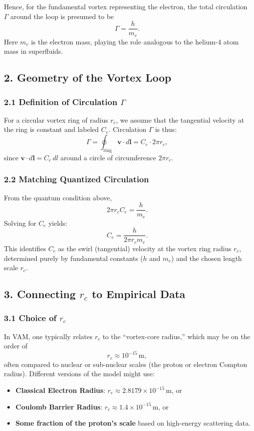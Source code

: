 \documentclass[aps,preprint,superscriptaddress]{revtex4-2}
\begin{document}
    Hence, for the fundamental vortex representing the electron, the total circulation \(\Gamma\) around the loop is presumed to be
    \[
        \Gamma = \frac{h}{m_e}.
    \]
    Here \(m_e\) is the electron mass, playing the role analogous to the helium-4 atom mass in superfluids.

    \subsection*{2. Geometry of the Vortex Loop}

    \subsubsection*{2.1 Definition of Circulation \(\Gamma\)}

    For a circular vortex ring of radius \(r_c\), we assume that the tangential velocity at the ring is constant and labeled \(C_e\). Circulation \(\Gamma\) is thus:
    \[
        \Gamma = \oint_{\text{ring}} \mathbf{v} \cdot d\mathbf{l} = C_e \cdot 2 \pi r_c,
    \]
    since \(\mathbf{v} \cdot d\mathbf{l} = C_e \,dl\) around a circle of circumference \(2\pi r_c\).

    \subsubsection*{2.2 Matching Quantized Circulation}

    From the quantum condition above,
    \[
        2 \pi r_c C_e = \frac{h}{m_e}.
    \]
    Solving for \(C_e\) yields:
    \[
        C_e = \frac{h}{2 \pi r_c m_e}.
    \]
    This identifies \(C_e\) as the swirl (tangential) velocity at the vortex ring radius \(r_c\), determined purely by fundamental constants (\(h\) and \(m_e\)) and the chosen length scale \(r_c\).

    \subsection*{3. Connecting \(r_c\) to Empirical Data}

    \subsubsection*{3.1 Choice of \(r_c\)}

    In VAM, one typically relates \(r_c\) to the “vortex-core radius,” which may be on the order of
    \[
        r_c \approx 10^{-15}\,\text{m},
    \]
    often compared to nuclear or sub-nuclear scales (the proton or electron Compton radius). Different versions of the model might use:
    \begin{itemize}
        \item \textbf{Classical Electron Radius}: \(r_e \approx 2.8179 \times 10^{-15}\,\mathrm{m}\), or
        \item \textbf{Coulomb Barrier Radius}: \(r_c \approx 1.4 \times 10^{-15}\,\mathrm{m}\), or
        \item \textbf{Some fraction of the proton’s scale} based on high-energy scattering data.
    \end{itemize}
\end{document}
